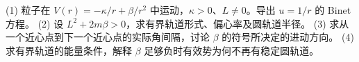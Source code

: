 (1) 粒子在 \(V(r)=-\kappa/r+\beta/r^2\) 中运动，\(\kappa>0\)、\(L\ne0\)。导出 \(u=1/r\) 的 Binet 方程。
(2) 设 \(L^2+2m\beta>0\)，求有界轨道形式、偏心率及圆轨道半径。
(3) 求从一个近心点到下一个近心点的实际角间隔，讨论 \(\beta\) 的符号所决定的进动方向。
(4) 求有界轨道的能量条件，解释 \(\beta\) 足够负时有效势为何不再有稳定圆轨道。
